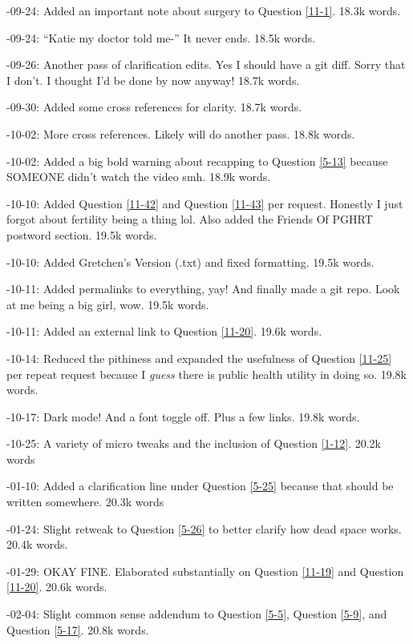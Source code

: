 \documentclass{article}
\begin{document}
-09-24: Added an important note about surgery to Question \ref{11-1}. 18.3k words.

-09-24: “Katie my doctor told me-” It never ends. 18.5k words.

-09-26: Another pass of clarification edits. Yes I should have a git diff. Sorry that I don't. I thought I'd be done by now anyway! 18.7k words.

-09-30: Added some cross references for clarity. 18.7k words.

-10-02: More cross references. Likely will do another pass. 18.8k words.

-10-02: Added a big bold warning about recapping to Question \ref{5-13} because SOMEONE didn't watch the video smh. 18.9k words.

-10-10: Added Question \ref{11-42} and Question \ref{11-43} per request. Honestly I just forgot about fertility being a thing lol. Also added the Friends Of PGHRT postword section. 19.5k words.

-10-10: Added Gretchen's Version (.txt) and fixed formatting. 19.5k words.

-10-11: Added permalinks to everything, yay! And finally made a git repo. Look at me being a big girl, wow. 19.5k words.

-10-11: Added an external link to Question \ref{11-20}. 19.6k words.

-10-14: Reduced the pithiness and expanded the usefulness of Question \ref{11-25} per repeat request because I \textit{guess} there is public health utility in doing so. 19.8k words.

-10-17: Dark mode! And a font toggle off. Plus a few links. 19.8k words.

-10-25: A variety of micro tweaks and the inclusion of Question \ref{1-12}. 20.2k words

-01-10: Added a clarification line under Question \ref{5-25} because that should be written somewhere. 20.3k words

-01-24: Slight retweak to Question \ref{5-26} to better clarify how dead space works. 20.4k words.

-01-29: OKAY FINE. Elaborated substantially on Question \ref{11-19} and Question \ref{11-20}. 20.6k words.

-02-04: Slight common sense addendum to Question \ref{5-5}, Question \ref{5-9}, and Question \ref{5-17}. 20.8k words.
\end{document}
